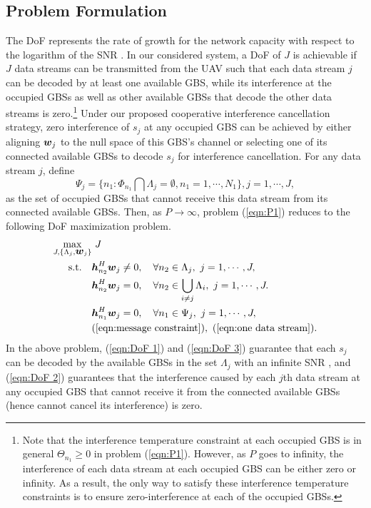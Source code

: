 \documentclass[onecolumn, draftclsnofoot, 12pt]{IEEEtran}
\newcommand{\mv}[1]{\mbox{\boldmath{$ #1 $}}}
\begin{document}
\subsection{Problem Formulation}\label{sec:Optimization 1}

The DoF represents the rate of growth for the network capacity with respect to the logarithm of the SNR \cite{Jafar08}. In our considered system, a DoF of $J$ is achievable if $J$ data streams can be transmitted from the UAV such that each data stream $j$ can be decoded by at least one available GBS, while its interference at the occupied GBSs as well as other available GBSs that decode the other data streams is zero.\footnote{Note that the interference temperature constraint at each occupied GBS is in general $\Theta_{n_1}\geq 0$ in problem (\ref{eqn:P1}). However, as $P$ goes to infinity, the interference of each data stream at each occupied GBS can be either zero or infinity. As a result, the only way to satisfy these interference temperature constraints is to ensure zero-interference at each of the occupied GBSs.} Under our proposed cooperative interference cancellation strategy, zero interference of $s_j$ at any occupied GBS can be achieved by either aligning $\mv{w}_j$ to the null space of this GBS's channel or selecting one of its connected available GBSs to decode $s_j$ for interference cancellation. For any data stream $j$, define
\begin{equation}\label{eqn:occupied GBS without data stream j}
\Psi_j\!=\!\{n_1\!:\!\Phi_{n_1}\bigcap \Lambda_j\!=\!\emptyset, n_1=1,\cdots\!,N_1\}, j=1,\cdots\!,J,
\end{equation}
as the set of occupied GBSs that cannot receive this data stream from its connected available GBSs. Then, as $P\rightarrow \infty$, problem (\ref{eqn:P1}) reduces to the following DoF maximization problem.
\begin{subequations}\label{eqn:P2}\begin{align}
\mathop{ \underset{J,\{\Lambda_j,\mv{w}_j\}}{\max}} & ~ J \label{eqn:problem 1}\\
\mathrm{s.t.} \ \ \ & \mv{h}_{n_2}^H\mv{w}_j\neq 0, ~~~ \forall n_2\in \Lambda_j, ~ j=1,\cdots,J, \label{eqn:DoF 1} \\ & \mv{h}_{n_2}^H\mv{w}_j=0, ~~~ \forall n_2\in \bigcup\limits_{i\neq j}\Lambda_i, ~ j=1,\cdots,J. \label{eqn:DoF 3} \\ & \mv{h}_{n_1}^H\mv{w}_j=0, ~~~ \forall n_1\in \Psi_j, ~ j=1,\cdots,J, \label{eqn:DoF 2} \\ & ({\rm \ref{eqn:message constraint}}), ~ ({\rm \ref{eqn:one data stream}}).
\end{align}\end{subequations}In the above problem, (\ref{eqn:DoF 1}) and (\ref{eqn:DoF 3}) guarantee that each $s_j$ can be decoded by the available GBSs in the set $\Lambda_j$ with an infinite SNR \cite{Jafar08}, and (\ref{eqn:DoF 2}) guarantees that the interference caused by each $j$th data stream at any occupied GBS that cannot receive it from the connected available GBSs (hence cannot cancel its interference) is zero.
\end{document}
